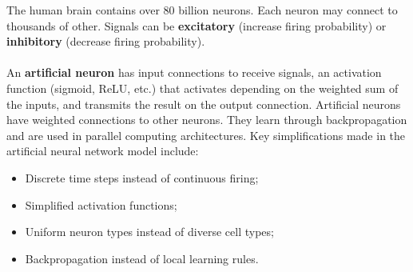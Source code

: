\documentclass[a4paper,11pt]{article}
\begin{document}
The human brain contains over 80 billion neurons.
Each neuron may connect to thousands of other.
Signals can be \textbf{excitatory} (increase firing probability) or \textbf{inhibitory} (decrease firing probability).
\\\\
An \textbf{artificial neuron} has input connections to receive signals, an activation function (sigmoid, ReLU, etc.) that activates depending on the weighted sum of the inputs, and transmits the result on the output connection.
Artificial neurons have weighted connections to other neurons.
They learn through backpropagation and are used in parallel computing architectures.
Key simplifications made in the artificial neural network model include:
\begin{itemize}
    \item   Discrete time steps instead of continuous firing;
    \item   Simplified activation functions;
    \item   Uniform neuron types instead of diverse cell types;
    \item   Backpropagation instead of local learning rules.
\end{itemize}
\end{document}
